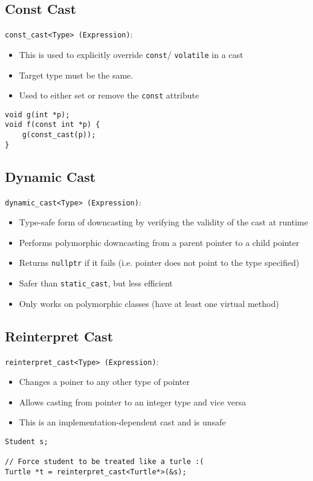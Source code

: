\documentclass[12pt]{article}
\begin{document}
\subsection{Const Cast}
\lstinline{const_cast<Type> (Expression)}:
\begin{itemize}
    \item This is used to explicitly override \lstinline{const}/ \lstinline{volatile} in a cast
    \item Target type must be the same.
    \item Used to either set or remove the \lstinline{const} attribute
\end{itemize}
\begin{lstlisting}
void g(int *p);
void f(const int *p) {
    g(const_cast(p));
}
\end{lstlisting}

\subsection{Dynamic Cast}
\lstinline{dynamic_cast<Type> (Expression)}:
\begin{itemize}
    \item Type-safe form of downcasting by verifying the validity of the cast at runtime
    \item Performs polymorphic downcasting from a parent pointer to a child pointer
    \item Returns \lstinline{nullptr} if it fails (i.e. pointer does not point to the type specified)
    \item Safer than \lstinline{static_cast}, but less efficient
    \item Only works on polymorphic classes (have at least one virtual method)
\end{itemize}

\subsection{Reinterpret Cast}
\lstinline{reinterpret_cast<Type> (Expression)}:
\begin{itemize}
    \item Changes a poiner to any other type of pointer
    \item Allows casting from pointer to an integer type and vice versa
    \item This is an implementation-dependent cast and is unsafe
\end{itemize}
\begin{lstlisting}
Student s; 

// Force student to be treated like a turle :(
Turtle *t = reinterpret_cast<Turtle*>(&s);
\end{lstlisting}
\end{document}
